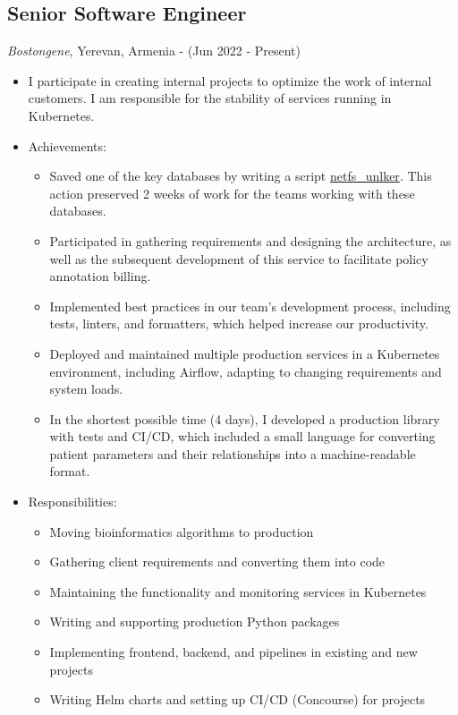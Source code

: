 \documentclass{article}
\begin{document}
\subsection*{Senior Software Engineer}
\textit{Bostongene}, Yerevan, Armenia - (Jun 2022 - Present)
\begin{itemize}
    \item I participate in creating internal projects to optimize the work of internal customers. I am responsible for the stability of services running in Kubernetes.  
    \item Achievements:
    \begin{itemize}
        \item Saved one of the key databases by writing a script \href{https://github.com/WindowGenerator/netfs_unlker}{netfs\_unlker}. This action preserved 2 weeks of work for the teams working with these databases.
        \item Participated in gathering requirements and designing the architecture, as well as the subsequent development of this service to facilitate policy annotation billing.
        \item Implemented best practices in our team's development process, including tests, linters, and formatters, which helped increase our productivity.
        \item Deployed and maintained multiple production services in a Kubernetes environment, including Airflow, adapting to changing requirements and system loads.
        \item In the shortest possible time (4 days), I developed a production library with tests and CI/CD, which included a small language for converting patient parameters and their relationships into a machine-readable format.
    \end{itemize}
    \item Responsibilities:
    \begin{itemize}
        \item Moving bioinformatics algorithms to production
        \item Gathering client requirements and converting them into code
        \item Maintaining the functionality and monitoring services in Kubernetes
        \item Writing and supporting production Python packages
        \item Implementing frontend, backend, and pipelines in existing and new projects
        \item Writing Helm charts and setting up CI/CD (Concourse) for projects

\end{itemize}
\end{itemize}
\end{document}
